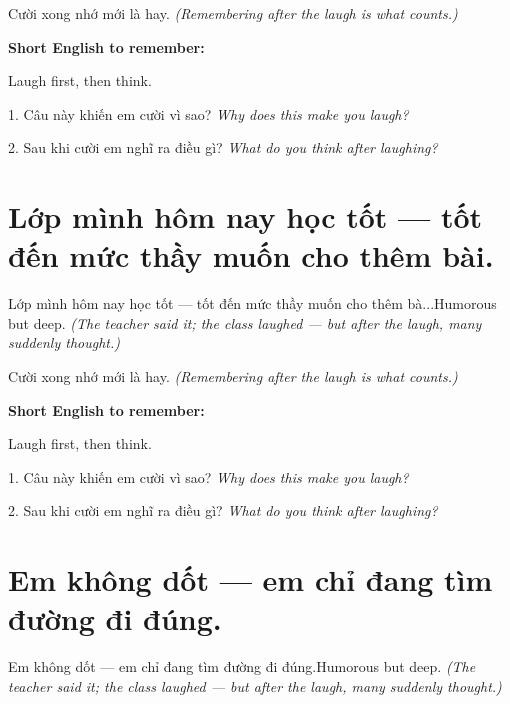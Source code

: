 \begin{baihoc}
Cười xong nhớ mới là hay.
\textit{(Remembering after the laugh is what counts.)}
\end{baihoc}

\begin{ghinhoanh}
\textbf{Short English to remember:}

Laugh first, then think.

\end{ghinhoanh}

\begin{tuhocnhanh}
1. Câu này khiến em cười vì sao? \textit{Why does this make you laugh?}

2. Sau khi cười em nghĩ ra điều gì? \textit{What do you think after laughing?}
\end{tuhocnhanh}
\ngancach


\section{Lớp mình hôm nay học tốt — tốt đến mức thầy muốn cho thêm bài.}
\begin{truyen}{Lớp mình hôm nay học tốt — tốt đến mức thầy muốn cho thêm bà...}{Humorous but deep.}
\textit{(The teacher said it; the class laughed — but after the laugh, many suddenly thought.)}
\end{truyen}

\begin{baihoc}
Cười xong nhớ mới là hay.
\textit{(Remembering after the laugh is what counts.)}
\end{baihoc}

\begin{ghinhoanh}
\textbf{Short English to remember:}

Laugh first, then think.

\end{ghinhoanh}

\begin{tuhocnhanh}
1. Câu này khiến em cười vì sao? \textit{Why does this make you laugh?}

2. Sau khi cười em nghĩ ra điều gì? \textit{What do you think after laughing?}
\end{tuhocnhanh}
\ngancach


\section{Em không dốt — em chỉ đang tìm đường đi đúng.}
\begin{truyen}{Em không dốt — em chỉ đang tìm đường đi đúng.}{Humorous but deep.}
\textit{(The teacher said it; the class laughed — but after the laugh, many suddenly thought.)}
\end{truyen}

